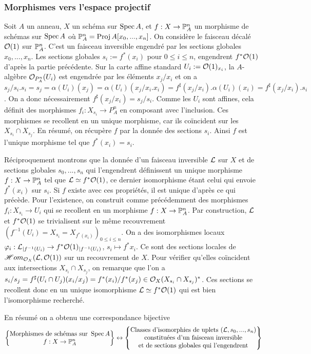 \subsubsection{Morphismes vers l'espace projectif}
\label{morphismeproj}

Soit $A$ un anneau, $X$ un schéma sur $\operatorname{Spec} A$, et $f:X\rightarrow\mathbb{P}_A^n$ un morphisme de schémas sur $\operatorname{Spec} A$ où $\mathbb{P}^n_A=\operatorname{Proj} A[x_0,...,x_n]$. On considère le faisceau décalé $\mathcal{O}(1)$ sur $\mathbb{P}^n_A$. C'est un faisceau inversible engendré par les sections globales $x_0,...,x_n$. Les sections globales $s_i:=f^*(x_i)$ pour $0\leq i\leq n$, engendrent $f^*\mathcal{O}(1)$ d'après la partie précédente. Sur la carte affine standard $U_i:=\mathcal{O}(1)_{x_i}$, la $A$-algèbre $\mathcal{O}_{P^n_A}(U_i)$ est engendrée par les éléments $x_j/x_i$ et on a $s_j/s_i.s_i=s_j=\alpha(U_i)(x_j)=\alpha(U_i)(x_j/x_i.x_i)=f^\sharp(x_j/x_i).\alpha(U_i)(x_i)=f^\sharp(x_j/x_i).s_i$. On a donc nécessairement $f^\sharp(x_j/x_i)=s_j/s_i$. Comme les $U_i$ sont affines, cela définit des morphismes $f_i:X_{s_i}\rightarrow P^n_A$ en composant avec l'inclusion. Ces morphismes se recollent en un unique morphisme, car ils coïncident sur les $X_{s_i}\cap X_{s_j}$. En résumé, on récupère $f$ par la donnée des sections $s_i$. Ainsi $f$ est l'unique morphisme tel que $f^*(x_i)=s_i$.

Réciproquement montrons que la donnée d'un faisceau inversible $\mathcal{L}$ sur $X$ et de sections globales $s_0,...,s_n$ qui l'engendrent définissent un unique morphisme $f:X\rightarrow \mathbb{P}^n_A$ tel que $\mathcal{L}\simeq f^*\mathcal{O}(1)$, ce dernier isomorphisme étant celui qui envoie $f^*(x_i)$ sur $s_i$. Si $f$ existe avec ces propriétés, il est unique d'après ce qui précède. Pour l'existence, on construit comme précédemment des morphismes $f_i:X_{s_i}\rightarrow U_i$ qui se recollent en un morphisme $f:X\rightarrow \mathbb{P}^n_A$. Par construction, $\mathcal{L}$ et $f^*\mathcal{O}(1)$ se trivialisent sur le même recouvrement $(f^{-1}(U_i)=X_{s_i}=X_{f^*(x_i)})_{0\leq i\leq n}$. On a des isomorphismes locaux $\varphi_i:\mathcal{L}_{|f^{-1}(U_i)}\rightarrow f^*\mathcal{O}(1)_{|f^{-1}(U_i)}$, $s_i\mapsto f^*x_i$. Ce sont des sections locales de $\mathscr{H}om_{\mathcal{O}_X}(\mathcal{L},\mathcal{O}(1))$ sur un recouvrement de $X$. Pour vérifier qu'elles coïncident aux intersections $X_{s_i}\cap X_{s_j}$, on remarque que l'on a $s_i/s_j=f^\sharp(U_i\cap U_j)(x_i/x_j)= f^*(x_i)/f^*(x_j)\in \mathcal{O}_X(X_{s_i}\cap X_{s_j})^*$. Ces sections se recollent donc en un unique isomorphisme $\mathcal{L}\simeq f^*\mathcal{O}(1)$ qui est bien l'isomorphisme recherché.

\noindent En résumé on a obtenu une correspondance bijective
$$
\left\{
\begin{matrix}
\text{Morphismes de schémas sur } \operatorname{Spec} A\\
f:X\rightarrow \mathbb{P}_A^n
\end{matrix}
\right\}
\leftrightarrow
\left\{
\begin{matrix}
\text{Classes d'isomorphies de uplets }(\mathcal{L}, s_0,...,s_n)\\
\text{constituées d'un faisceau inversible}\\
\text{et de sections globales qui l'engendrent}
\end{matrix}
\right\}
$$


